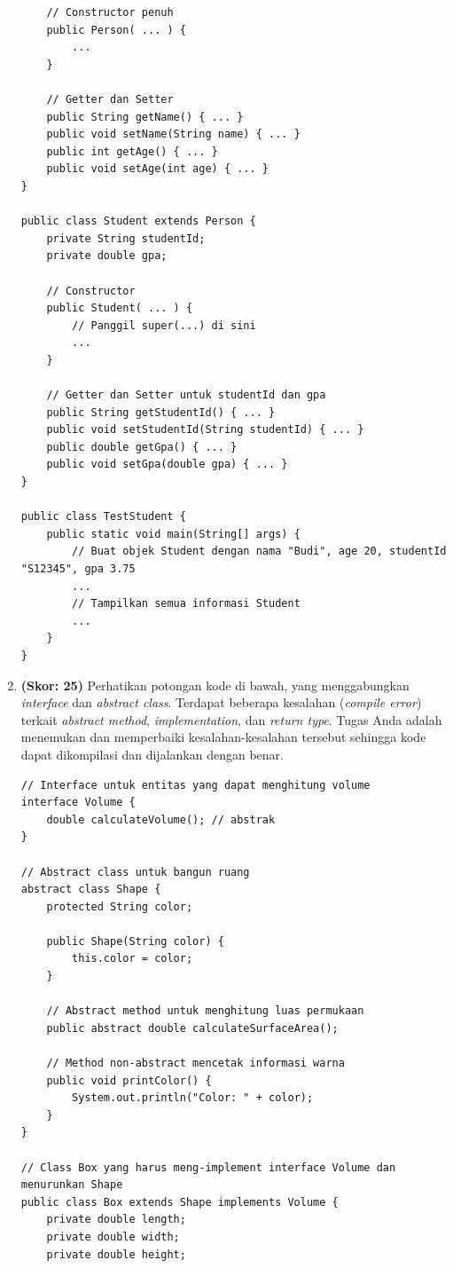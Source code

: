 \documentclass[10pt,openany,a4paper]{article}
\begin{document}
\begin{enumerate}
\begin{verbatim}
    // Constructor penuh
    public Person( ... ) {
        ...
    }

    // Getter dan Setter
    public String getName() { ... }
    public void setName(String name) { ... }
    public int getAge() { ... }
    public void setAge(int age) { ... }
}

public class Student extends Person {
    private String studentId;
    private double gpa;

    // Constructor
    public Student( ... ) {
        // Panggil super(...) di sini
        ...
    }

    // Getter dan Setter untuk studentId dan gpa
    public String getStudentId() { ... }
    public void setStudentId(String studentId) { ... }
    public double getGpa() { ... }
    public void setGpa(double gpa) { ... }
}

public class TestStudent {
    public static void main(String[] args) {
        // Buat objek Student dengan nama "Budi", age 20, studentId "S12345", gpa 3.75
        ...
        // Tampilkan semua informasi Student
        ...
    }
}
    \end{verbatim}

    \item \textbf{(Skor: 25)}  
    Perhatikan potongan kode di bawah, yang menggabungkan \textit{interface} dan \textit{abstract class}. Terdapat beberapa kesalahan (\textit{compile error}) terkait \textit{abstract method}, \textit{implementation}, dan \textit{return type}. Tugas Anda adalah menemukan dan memperbaiki kesalahan-kesalahan tersebut sehingga kode dapat dikompilasi dan dijalankan dengan benar.
    
    \begin{verbatim}
// Interface untuk entitas yang dapat menghitung volume
interface Volume {
    double calculateVolume(); // abstrak
}

// Abstract class untuk bangun ruang
abstract class Shape {
    protected String color;

    public Shape(String color) {
        this.color = color;
    }

    // Abstract method untuk menghitung luas permukaan
    public abstract double calculateSurfaceArea();

    // Method non-abstract mencetak informasi warna
    public void printColor() {
        System.out.println("Color: " + color);
    }
}

// Class Box yang harus meng-implement interface Volume dan menurunkan Shape
public class Box extends Shape implements Volume {
    private double length;
    private double width;
    private double height;


\end{verbatim}
\end{enumerate}
\end{document}
